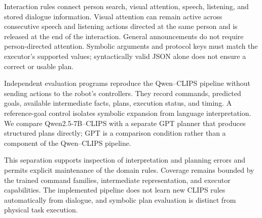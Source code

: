Interaction rules connect person search, visual attention, speech, listening, and stored dialogue information. Visual attention can remain active across consecutive speech and listening actions directed at the same person and is released at the end of the interaction. General announcements do not require person-directed attention. Symbolic arguments and protocol keys must match the executor's supported values; syntactically valid JSON alone does not ensure a correct or usable plan.

Independent evaluation programs reproduce the Qwen--CLIPS pipeline without sending actions to the robot's controllers. They record commands, predicted goals, available intermediate facts, plans, execution status, and timing. A reference-goal control isolates symbolic expansion from language interpretation. We compare Qwen2.5-7B--CLIPS with a separate GPT planner that produces structured plans directly; GPT is a comparison condition rather than a component of the Qwen--CLIPS pipeline.

This separation supports inspection of interpretation and planning errors and permits explicit maintenance of the domain rules. Coverage remains bounded by the trained command families, intermediate representation, and executor capabilities. The implemented pipeline does not learn new CLIPS rules automatically from dialogue, and symbolic plan evaluation is distinct from physical task execution.
